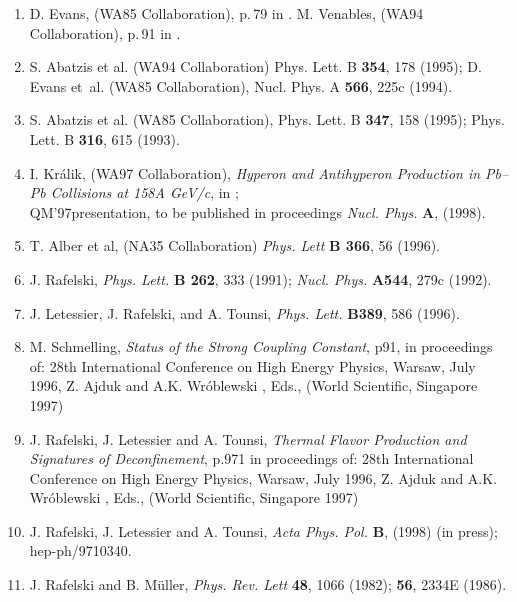 \begin{mdframed}[linecolor=gray,roundcorner=12pt,backgroundcolor=Dandelion!15,linewidth=1pt,leftmargin=0cm,rightmargin=0cm,topline=true,bottomline=true,skipabove=12pt]
{\begin{enumerate}
\item%
D. Evans, (WA85 Collaboration), p.\,79 in \cite{S96}. %
M. Venables, (WA94 Collaboration), p.\,91 in \cite{S96}.

\item%
S. Abatzis et al. (WA94 Collaboration)
Phys. Lett. B {\bf 354}, 178 (1995); D. Evans {et~al.} (WA85 Collaboration),
{Nucl. Phys.} A {\bf 566}, 225c (1994).
  
\item%
S. Abatzis {et al.} (WA85 Collaboration), 
{Phys. Lett.} B {\bf 347}, 158 (1995); 
{Phys. Lett.} B {\bf 316}, 615 (1993).  
 
\item%
I. Kr\'alik, (WA97 Collaboration), 
{\it Hyperon and Antihyperon Production in 
Pb--Pb Collisions at 158A GeV/c}, in \cite{SQM97};\\
QM'97presentation, to be published in
proceedings {\it Nucl. Phys. } {\bf A}, (1998).

\item%
T. Alber et al, (NA35 Collaboration)
{\it Phys. Lett} {\bf B 366}, 56 (1996).

\item%
J. Rafelski, {\it Phys. Lett.} {\bf B 262}, 333 (1991);
{\it Nucl. Phys.} {\bf A544}, 279c (1992).

\item%
J. Letessier, J. Rafelski, and A. Tounsi,
 {\it Phys. Lett.} {\bf B389}, 586 (1996).
 
\item%
M. Schmelling, 
{\it Status of the Strong Coupling Constant}, p91, in
proceedings of: 28th International Conference on High
Energy  Physics, Warsaw, July 1996, Z. Ajduk and 
A.K. Wr\'oblewski , Eds.,  (World Scientific, Singapore 1997)

\item%
J. Rafelski, J. Letessier and A. Tounsi,
{\it Thermal Flavor Production and Signatures of Deconfinement},
p.971 in proceedings of: 28th International Conference on High
Energy  Physics, Warsaw, July 1996, Z. Ajduk and 
A.K. Wr\'oblewski , Eds.,  (World Scientific, Singapore 1997)

\item%
J. Rafelski, J. Letessier and A. Tounsi,
{\it Acta Phys. Pol.} {\bf B},  (1998) (in press); hep-ph/9710340.

 
\item%
J. Rafelski and B. M\"uller, {\it Phys. Rev. Lett}
{\bf 48}, 1066 (1982); {\bf 56}, 2334E (1986).


\end{enumerate}}
\end{mdframed}
